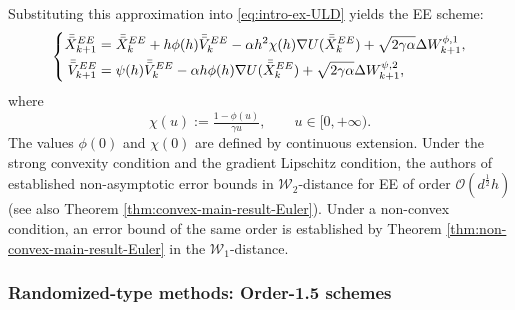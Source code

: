 \documentclass[12pt]{article}
\numberwithin{equation}{section}
\begin{document}
Substituting this approximation into
\eqref{eq:intro-ex-ULD} yields the EE scheme:
\begin{equation}
\label{eq:intro-EE}
\left\{
\begin{aligned}
    \Bar{\Bar{X}}_{k+1}^{EE}
    &=
    \Bar{\Bar{X}}_{k}^{EE}
    +
    h\phi(h)\Bar{\Bar{V}}_{k}^{EE}
    -
    \alpha h^2
    \chi(h)
    \nabla U(\Bar{\Bar{X}}_{k}^{EE})
    +
    \sqrt{2\gamma\alpha}
    \Delta W_{k+1}^{\phi,1},
    \\
    \Bar{\Bar{V}}_{k+1}^{EE}
    &=
    \psi(h)\Bar{\Bar{V}}_{k}^{EE}
    -
    \alpha h\phi(h)
    \nabla U(\Bar{\Bar{X}}_{k}^{EE})
    +
    \sqrt{2\gamma\alpha}
    \Delta W_{k+1}^{\psi,2},
\end{aligned}
\right.
\end{equation}
where 
\begin{equation}
\label{eq:define-chi}
\chi(u)
:=
\tfrac{1-\phi(u)}{\gamma u},
\qquad
u\in[0,+\infty).
\end{equation}
The values $\phi(0)$ and $\chi(0)$ are defined by continuous extension.
Under the strong convexity condition and the gradient Lipschitz condition, 
the authors of \cite{cheng2018underdamped,dalalyan2020sampling} established non-asymptotic error bounds in \(\mathcal W_2\)-distance for EE of order $\mathcal{O}(d^{\frac{1}{2}}h)$ (see also Theorem \ref{thm:convex-main-result-Euler}). Under a non-convex condition, an error bound of the same order is established by Theorem \ref{thm:non-convex-main-result-Euler} in the \(\mathcal W_1\)-distance.


\subsubsection{Randomized-type methods: Order-1.5 schemes}

\end{document}
